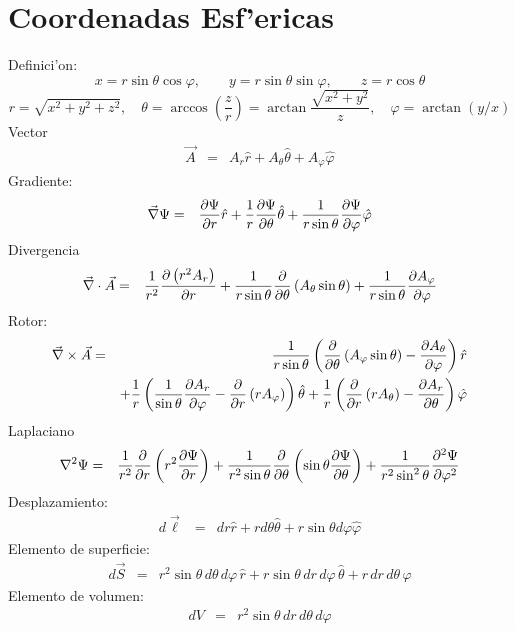 \section{Coordenadas Esf'ericas}
Definici'on:
\begin{equation}
 x = r\sin\theta\cos\varphi,\qquad 
 y = r\sin\theta\sin\varphi ,\qquad
 z = r\cos\theta 
\end{equation}
\begin{equation}
 r =\sqrt{x^2 + y^2 + z^2} ,\quad 
\theta =\arccos(\frac{z}{r}) =\arctan{\frac{\sqrt{x^2+y^2}}{z}},\quad
\varphi =\arctan{(y/x)} 
\end{equation}
Vector
\begin{eqnarray}
\vec{A} 
&=& A_r {\hat r} + A_\theta {\hat\theta} +
A_\varphi {\hat\varphi}
\end{eqnarray}
Gradiente:
\begin{eqnarray}
\vec\nabla\Psi
 &=& {\partial\Psi\over\partial r} {\hat r} 
 + {1\over r}{\partial\Psi\over\partial\theta} {\hat\theta} 
 + {1\over r\sin\theta}{\partial\Psi\over\partial\varphi} {\hat\varphi}
\end{eqnarray} 
Divergencia
\begin{eqnarray}
\vec\nabla\cdot\vec{A}
&=& {1\over r^2}{\partial\left( r^2 A_r\right)\over\partial r} 
 + {1\over r\sin\theta}{\partial\over\partial\theta}\left( 
A_\theta\sin\theta\right) 
 + {1\over r\sin\theta}{\partial A_\varphi\over\partial\varphi}
\end{eqnarray} 
Rotor:
\begin{eqnarray}
\vec\nabla\times\vec{A}
&=& {1\over r\sin\theta}\left({\partial\over\partial\theta}
\left( A_\varphi\sin\theta\right) - {\partial A_\theta\over\partial
\varphi}\right) {\hat r}\nonumber\\
&&+ {1\over r}\left({1\over\sin\theta}{\partial A_r\over\partial
\varphi} - {\partial\over\partial r}\left( r A_\varphi\right)\right)
 {\hat\theta} + {1\over r}\left({\partial\over\partial r}\left( r
A_\theta
\right) - {\partial A_r\over\partial\theta}\right) {\hat\varphi}
\end{eqnarray}
Laplaciano
\begin{eqnarray}
\nabla^2\Psi
&=& {1\over r^2}{\partial\over\partial r}\left(r^2 {\partial\Psi\over
\partial r}\right) + {1\over r^2\sin\theta}{\partial\over\partial
\theta}\left(\sin\theta {\partial\Psi\over\partial\theta}\right) 
 + {1\over r^2\sin^2\theta}{\partial^2\Psi\over\partial\varphi^2}
\end{eqnarray} 
Desplazamiento:
\begin{eqnarray}
 d\vec{\ell} 
&= & dr {\hat r} + rd\theta {\hat\theta} +r\sin\theta d\varphi {\hat\varphi}
\end{eqnarray} 
Elemento de superficie:
\begin{eqnarray}
 d\vec{S} 
&=& r^2\sin\theta\,d\theta\,d\varphi\, {\hat r} + r\sin\theta
\,dr\,d\varphi\, {\hat\theta} + r\,dr\,d\theta\, {\hat\varphi}
\end{eqnarray}
Elemento de volumen:
\begin{eqnarray}
 dV 
&=& r^2\sin\theta\,dr\,d\theta\, d\varphi
\end{eqnarray} 
